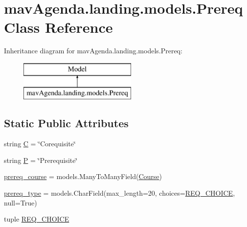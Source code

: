 \hypertarget{classmavAgenda_1_1landing_1_1models_1_1Prereq}{}\section{mav\+Agenda.\+landing.\+models.\+Prereq Class Reference}
\label{classmavAgenda_1_1landing_1_1models_1_1Prereq}
Inheritance diagram for mav\+Agenda.\+landing.\+models.\+Prereq\+:\begin{figure}[H]
\begin{center}
\leavevmode
\includegraphics[height=2.000000cm]{classmavAgenda_1_1landing_1_1models_1_1Prereq}
\end{center}
\end{figure}
\subsection*{Static Public Attributes}
\begin{DoxyCompactItemize}
\item 
string \mbox{\hyperlink{classmavAgenda_1_1landing_1_1models_1_1Prereq_addf5211dcaf1971dd0cca476d7ed9e14}{C}} = \char`\"{}Corequisite\char`\"{}
\item 
string \mbox{\hyperlink{classmavAgenda_1_1landing_1_1models_1_1Prereq_af35ddd9df5e0a2abaa462d090fd507b5}{P}} = \char`\"{}Prerequisite\char`\"{}
\item 
\mbox{\hyperlink{classmavAgenda_1_1landing_1_1models_1_1Prereq_ad766b43af7f45acb941a884f8eaa1c0c}{prereq\+\_\+course}} = models.\+Many\+To\+Many\+Field(\mbox{\hyperlink{classmavAgenda_1_1landing_1_1models_1_1Course}{Course}})
\item 
\mbox{\hyperlink{classmavAgenda_1_1landing_1_1models_1_1Prereq_ac496f0f4d66a6777102ac8fd8f33746f}{prereq\+\_\+type}} = models.\+Char\+Field(max\+\_\+length=20, choices=\mbox{\hyperlink{classmavAgenda_1_1landing_1_1models_1_1Prereq_af85f9fea720c6735fecfce55e751b538}{R\+E\+Q\+\_\+\+C\+H\+O\+I\+CE}}, null=True)
\item 
tuple \mbox{\hyperlink{classmavAgenda_1_1landing_1_1models_1_1Prereq_af85f9fea720c6735fecfce55e751b538}{R\+E\+Q\+\_\+\+C\+H\+O\+I\+CE}}
\end{DoxyCompactItemize}


